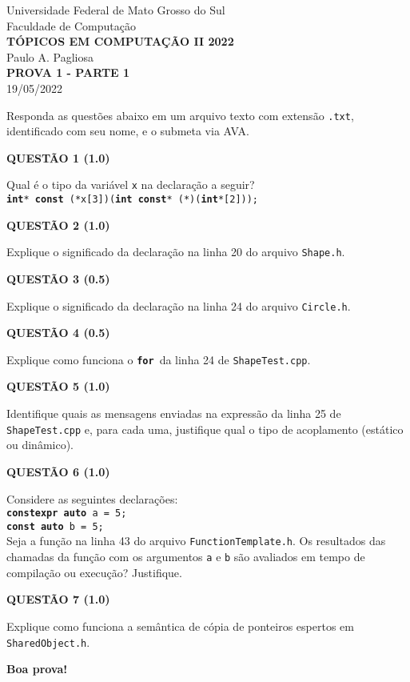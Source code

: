 \documentclass[12pt]{article}
\newcommand{\kw}[1]{{\color{myblue}\texttt{\textbf{#1}}}}
\newcommand{\hfile}[1]{{\color{myorange}\texttt{#1.h}}}
\newcommand{\cfile}[1]{{\color{myorange}\texttt{#1.cpp}}}
\begin{document}
\pagestyle{empty}

\begin{center}
  Universidade Federal de Mato Grosso do Sul \\
  Faculdade de Computação \\[1em]
  {\bf\large TÓPICOS EM COMPUTAÇÃO II 2022} \\
  Paulo A. Pagliosa \\[1em]
  {\bf PROVA 1 - PARTE 1} \\
  19/05/2022
\end{center}

\vspace{5mm}
\noindent
Responda as questões abaixo em um arquivo texto com extensão \texttt{.txt}, identificado com seu nome, e o submeta via AVA.


\vspace{5mm}
\noindent
{\bf QUESTÃO 1 (1.0)}

\noindent
Qual é o tipo da variável \texttt{x} na declaração a seguir?\\[1.5ex]
\texttt{\kw{int}* \kw{const}\ (*x[3])(\kw{int const}* (*)(\kw{int}*[2]));}

\vspace{5mm}
\noindent
{\bf QUESTÃO 2 (1.0)}

\noindent
Explique o significado da declaração na linha 20 do arquivo \hfile{Shape}.

\vspace{5mm}
\noindent
{\bf QUESTÃO 3 (0.5)}

\noindent
Explique o significado da declaração na linha 24 do arquivo \hfile{Circle}.

\vspace{5mm}
\noindent
{\bf QUESTÃO 4 (0.5)}

\noindent
Explique como funciona o \kw{for}\ da linha 24 de \cfile{ShapeTest}.

\vspace{4mm}
\noindent
{\bf QUESTÃO 5 (1.0)}

\noindent
Identifique quais as mensagens enviadas na expressão da linha 25 de \cfile{ShapeTest} e, para cada uma, justifique qual o tipo de acoplamento (estático ou dinâmico).

\vspace{5mm}
\noindent
{\bf QUESTÃO 6 (1.0)}

\noindent
Considere as seguintes declarações:\\[1.5ex]
\texttt{\kw{constexpr auto}\ a = 5;}\\
\texttt{\kw{const auto}\ b = 5;}\\[1.5ex]
Seja a função na linha 43 do arquivo \hfile{FunctionTemplate}. Os resultados das chamadas da função com os argumentos \texttt{a} e \texttt{b} são avaliados em tempo de compilação ou execução? Justifique.

\vspace{5mm}
\noindent
{\bf QUESTÃO 7 (1.0)}

\noindent
Explique como funciona a semântica de cópia de ponteiros espertos em \hfile{SharedObject}.

\vspace{1cm}
\centerline{\bf Boa prova!}
\end{document}
